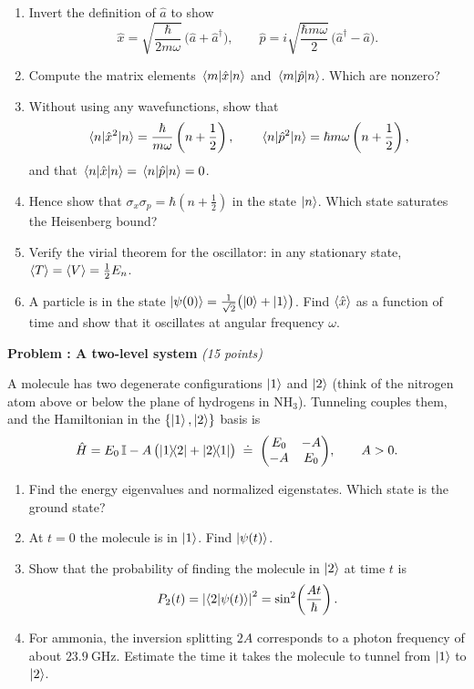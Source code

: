 \documentclass[11pt]{article}
\newcounter{problem}
\newcommand{\problem}[2]{%
  \stepcounter{problem}%
  \par\bigskip\noindent\textbf{Problem \theproblem: #1} \hfill \textit{(#2 points)}\par\smallskip}
\newcommand{\ad}{\hat{a}^\dagger}
\newcommand{\an}{\hat{a}}
\begin{document}
\begin{enumerate}
  \item Invert the definition of $\an$ to show
  \[
    \hat{x} = \sqrt{\frac{\hbar}{2m\omega}}\,\bigl(\an + \ad\bigr), \qquad
    \hat{p} = i\sqrt{\frac{\hbar m\omega}{2}}\,\bigl(\ad - \an\bigr).
  \]
  \item Compute the matrix elements $\mel{m}{\hat{x}}{n}$ and $\mel{m}{\hat{p}}{n}$. Which are nonzero?
  \item Without using any wavefunctions, show that
  \[
    \expval{\hat{x}^2}{n} = \frac{\hbar}{m\omega}\left(n + \frac12\right), \qquad
    \expval{\hat{p}^2}{n} = \hbar m\omega\left(n + \frac12\right),
  \]
  and that $\expval{\hat{x}}{n} = \expval{\hat{p}}{n} = 0$.
  \item Hence show that $\sigma_x\sigma_p = \hbar\left(n + \frac12\right)$ in the state $\ket{n}$. Which state saturates the Heisenberg bound?
  \item Verify the virial theorem for the oscillator: in any stationary state, $\expval{T} = \expval{V} = \frac12 E_n$.
  \item A particle is in the state $\ket{\psi(0)} = \frac{1}{\sqrt{2}}\bigl(\ket{0} + \ket{1}\bigr)$. Find $\expval{\hat{x}}$ as a function of time and show that it oscillates at angular frequency $\omega$.
\end{enumerate}

\problem{A two-level system}{15}

A molecule has two degenerate configurations $\ket{1}$ and $\ket{2}$ (think of the nitrogen atom above or below the plane of hydrogens in $\mathrm{NH_3}$). Tunneling couples them, and the Hamiltonian in the $\{\ket{1}, \ket{2}\}$ basis is
\[
  \hat{H} = E_0\,\mathbb{I} - A\,\bigl(\dyad{1}{2} + \dyad{2}{1}\bigr)
  \;\doteq\; \mqty(E_0 & -A \\ -A & E_0), \qquad A > 0.
\]
\begin{enumerate}
  \item Find the energy eigenvalues and normalized eigenstates. Which state is the ground state?
  \item At $t = 0$ the molecule is in $\ket{1}$. Find $\ket{\psi(t)}$.
  \item Show that the probability of finding the molecule in $\ket{2}$ at time $t$ is
  \[
    P_2(t) = \abs{\braket{2}{\psi(t)}}^2 = \sin^2\!\left(\frac{A t}{\hbar}\right).
  \]
  \item For ammonia, the inversion splitting $2A$ corresponds to a photon frequency of about $23.9~\text{GHz}$. Estimate the time it takes the molecule to tunnel from $\ket{1}$ to $\ket{2}$.
\end{enumerate}
\end{document}
